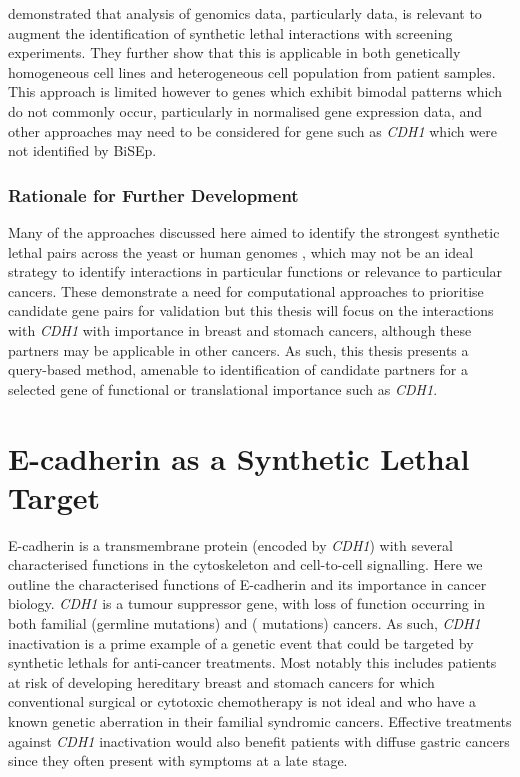 \citet{Wappett2016} demonstrated that analysis of \glspl{genomic} data, particularly  data, is relevant to augment the identification of \gls{synthetic lethal} interactions with screening experiments. They further show that this is applicable in both genetically homogeneous cell lines and heterogeneous cell population from patient samples. This approach is limited however to genes which exhibit bimodal  patterns which do not commonly occur, particularly in normalised \gls{gene expression} data, and other approaches may need to be considered for gene such as \textit{CDH1} which were not identified by \gls{BiSEp}.

\subsubsection{Rationale for Further Development}

Many of the approaches discussed here aimed to identify the strongest \gls{synthetic lethal} pairs across the yeast or human \glspl{genome} \citep{Lu2015, Wappett2016, Deshpande2013, Wu2014}, which may not be an ideal strategy to identify interactions in particular functions or relevance to particular cancers. These demonstrate a need for computational approaches to prioritise candidate gene pairs for validation but this thesis will focus on the interactions with \textit{CDH1} with importance in breast and stomach cancers, although these partners may be applicable in other cancers. As such, this thesis presents a query-based method, amenable to identification of candidate partners for a selected gene of functional or translational importance such as \textit{CDH1}.


\section{E-cadherin as a Synthetic Lethal Target}

\gls{E-cadherin} is a transmembrane protein (encoded by \textit{CDH1}) with several characterised functions in the cytoskeleton and cell-to-cell signalling. Here we outline the characterised functions of \gls{E-cadherin} and its importance in cancer biology. \textit{CDH1} is a \gls{tumour suppressor} gene, with loss of function occurring in both \gls{familial} (\gls{germline} \glspl{mutation}) and  ( \glspl{mutation}) cancers. As such, \textit{CDH1} inactivation is a prime example of a genetic event that could be targeted by \glspl{synthetic lethal} for anti-cancer \glspl{treatment}. Most notably this includes patients at risk of developing \gls{hereditary} breast and stomach cancers for which conventional surgical or cytotoxic \gls{chemotherapy} is not ideal and who have a known genetic aberration in their \gls{familial} syndromic cancers. Effective \glspl{treatment} against \textit{CDH1} inactivation would also benefit patients with  diffuse gastric cancers since they often present with symptoms at a late stage.

